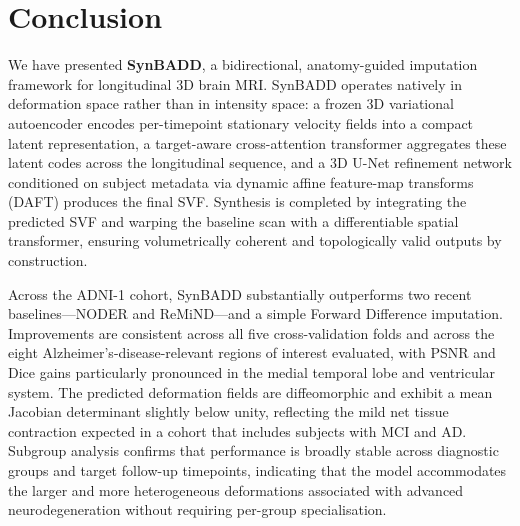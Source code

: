 \section{Conclusion}
\label{sec:conclusion}

We have presented \textbf{SynBADD}, a bidirectional, anatomy-guided imputation framework for longitudinal 3D brain MRI. SynBADD operates natively in deformation space rather than in intensity space: a frozen 3D variational autoencoder encodes per-timepoint stationary velocity fields into a compact latent representation, a target-aware cross-attention transformer aggregates these latent codes across the longitudinal sequence, and a 3D U-Net refinement network conditioned on subject metadata via dynamic affine feature-map transforms (DAFT) produces the final SVF. Synthesis is completed by integrating the predicted SVF and warping the baseline scan with a differentiable spatial transformer, ensuring volumetrically coherent and topologically valid outputs by construction.

Across the ADNI-1 cohort, SynBADD substantially outperforms two recent baselines---NODER and ReMiND---and a simple Forward Difference imputation. Improvements are consistent across all five cross-validation folds and across the eight Alzheimer's-disease-relevant regions of interest evaluated, with PSNR and Dice gains particularly pronounced in the medial temporal lobe and ventricular system. The predicted deformation fields are diffeomorphic and exhibit a mean Jacobian determinant slightly below unity, reflecting the mild net tissue contraction expected in a cohort that includes subjects with MCI and AD. Subgroup analysis confirms that performance is broadly stable across diagnostic groups and target follow-up timepoints, indicating that the model accommodates the larger and more heterogeneous deformations associated with advanced neurodegeneration without requiring per-group specialisation.

